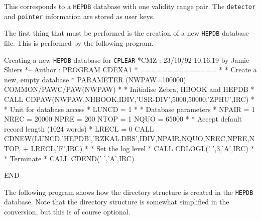 This corresponds to a {\tt HEPDB} database with one validity range pair.
The {\tt detector} and {\tt pointer} information are stored as user keys.

The first thing that must be performed is the creation of a new {\tt HEPDB}
database file. This is performed by the following program.

\begin{XMPt}{Creating a new {\tt HEPDB} database for {\tt CPLEAR}}
*CMZ :          23/10/92  10.16.19  by  Jamie Shiers
*-- Author :
      PROGRAM CDEXA1
*     ==============
*
*     Create a new, empty database
*
      PARAMETER   (NWPAW=100000)
      COMMON/PAWC/PAW(NWPAW)
*
*     Initialise Zebra, HBOOK and HEPDB
*
      CALL CDPAW(NWPAW,NHBOOK,IDIV,'USR-DIV',5000,50000,'ZPHU',IRC)
*
*     Unit for database access
*
      LUNCD  = 1
*
*     Database parameters
*
      NPAIR  = 1
      NREC   = 20000
      NPRE   = 200
      NTOP   = 1
      NQUO   = 65000
*
*     Accept default record length (1024 words)
*
      LRECL  = 0
      CALL CDNEW(LUNCD,'HEPDB','RZKAL.DBS',IDIV,NPAIR,NQUO,NREC,NPRE,NTOP,
     +           LRECL,'F',IRC)
*
*     Set the log level
*
      CALL CDLOGL(' ',3,'A',IRC)
*
*     Terminate
*
      CALL CDEND(' ','A',IRC)

      END
\end{XMPt}

The following program shows how the directory structure is created in
the {\tt HEPDB} database. Note that the directory structure is somewhat
simplified in the conversion, but this is of course optional.


